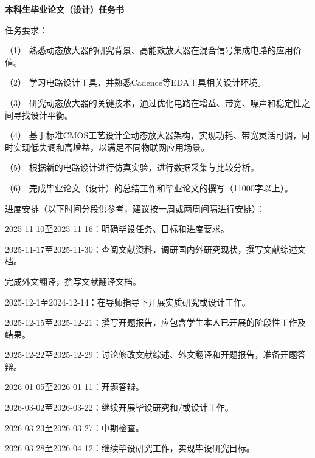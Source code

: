 {
\clearpage
{}
{}
}

\begin{center}
  \bfseries 本科生毕业论文（设计）任务书
\end{center}


\par
{}\par

任务要求：

（1） 熟悉动态放大器的研究背景、高能效放大器在混合信号集成电路的应用价值。

（2） 学习电路设计工具，并熟悉Cadence等EDA工具相关设计环境。

（3） 研究动态放大器的关键技术，通过优化电路在增益、带宽、噪声和稳定性之间寻找设计平衡。

（4） 基于标准CMOS工艺设计全动态放大器架构，实现功耗、带宽灵活可调，同时实现低失调和高增益，以满足不同物联网应用场景。

（5） 根据新的电路设计进行仿真实验，进行数据采集与比较分析。

（6） 完成毕业论文（设计）的总结工作和毕业论文的撰写（11000字以上）。



进度安排（以下时间分段供参考，建议按一周或两周间隔进行安排）：

2025-11-10至2025-11-16：明确毕设任务、目标和进度要求。

2025-11-17至2025-11-30：查阅文献资料，调研国内外研究现状，撰写文献综述文档。

完成外文翻译，撰写文献翻译文档。

2025-12-1至2024-12-14：在导师指导下开展实质研究或设计工作。

2025-12-15至2025-12-21：撰写开题报告，应包含学生本人已开展的阶段性工作及结果。

2025-12-22至2025-12-29：讨论修改文献综述、外文翻译和开题报告，准备开题答辩。

2026-01-05至2026-01-11：开题答辩。

2026-03-02至2026-03-22：继续开展毕设研究和/或设计工作。

2026-03-23至2026-03-27：中期检查。

2026-03-28至2026-04-12：继续毕设研究工作，实现毕设研究目标。

